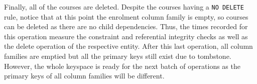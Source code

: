 \begin{description}
Finally, all of the courses are deleted. Despite the courses having a \texttt{NO
DELETE} rule, notice that at this point the enrolment column family is empty, so
courses can be deleted as there are no child dependencies. Thus, the times
recorded for this operation measure the constraint and referential integrity
checks as well as the delete operation of the respective entity. After this last
operation, all column families are emptied but all the primary keys still exist
due to tombstone. However, the whole keyspace is ready for the next batch of
operations as the primary keys of all column families will be different.


\end{description}		

			
			

		
 




